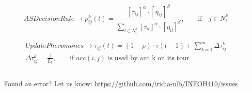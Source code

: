 \documentclass[11pt,a4paper]{article}
\theoremstyle{definition}%
\begin{document}
\begin{equation}\label{eq:deci}
	ASDecisionRule \rightarrow p_{ij}^k(t) = 
	\frac{\left[\tau_{ij}\right]^{\alpha}\cdot\left[\eta_{ij}\right]^\beta}
	 {\sum_{l \in N_i^k} 
	\left[\tau_{il}\right]^{\alpha}\cdot\left[\eta_{il}\right]^\beta},
	\qquad \text{if} \quad j\in N_i^k
\end{equation}

\begin{equation}\label{eq:phero}
\begin{aligned}
	UpdatePheromones \rightarrow \tau_{ij}(t) = 
	(1-\rho)\cdot\tau(t-1) + \sum_{k=1}^{m}\Delta\tau_{ij}^k 
	\\
	\Delta\tau_{ij}^k = \frac{1}{L_k}, \qquad \text{if $arc(i,j)$ is used 
	by 
	ant k on its tour}
\end{aligned}
\end{equation}

\noindent
\rule{\textwidth}{0.4pt}
\footnotesize{Found an error? Let us know: \url{https://github.com/iridia-ulb/INFOH410/issues}}
\end{document}
